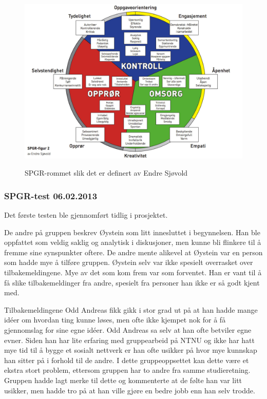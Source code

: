 \documentclass[a4paper,norsk,oneside]{article}
\begin{document}
\begin{figure}[H]
\centering
\includegraphics[scale=0.25]{figs/spgrfigur2}
\label{spgr}
\caption{SPGR-rommet slik det er definert av Endre Sjøvold}
\end{figure}

\subsubsection{SPGR-test 06.02.2013}
Det første testen ble gjennomført tidlig i prosjektet. 

De andre på gruppen beskrev Øystein som litt innesluttet i begynnelsen. Han ble oppfattet som veldig saklig og analytisk i diskusjoner, men kunne bli flinkere til å fremme sine synspunkter oftere. De andre mente alikevel at Øystein var en person som hadde mye å tilføre gruppen. Øystein selv var ikke spesielt overrasket over tilbakemeldingene. Mye av det som kom frem var som forventet. Han er vant til å få slike tilbakemeldinger fra andre, spesielt fra personer han ikke er så godt kjent med.

Tilbakemeldingene Odd Andreas fikk gikk i stor grad ut på at han hadde mange idéer om hvordan ting kunne løses, men ofte ikke kjempet nok for å få gjennomslag for sine egne idéer.
Odd Andreas sa selv at han ofte betviler egne evner. Siden han har lite erfaring med gruppearbeid på NTNU og ikke har hatt mye tid til å bygge et sosialt nettverk er han ofte usikker på hvor mye kunnskap han sitter på i forhold til de andre. I dette gruppeoppsettet kan dette være et ekstra stort problem, ettersom gruppen har to andre fra samme studieretning. Gruppen hadde lagt merke til dette og kommenterte at de følte han var litt usikker, men hadde tro på at han ville gjøre en bedre jobb enn han selv trodde.
\end{document}
